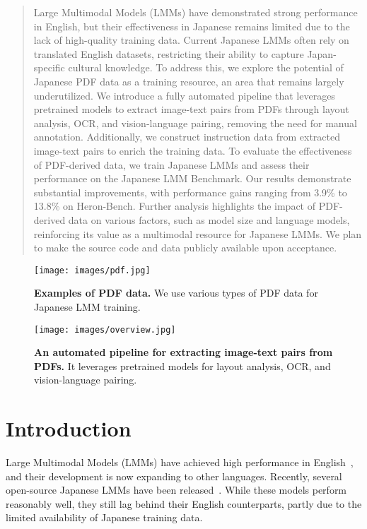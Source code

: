 \begin{abstract}
Large Multimodal Models (LMMs) have demonstrated strong performance in English, but their effectiveness in Japanese remains limited due to the lack of high-quality training data. Current Japanese LMMs often rely on translated English datasets, restricting their ability to capture Japan-specific cultural knowledge. To address this, we explore the potential of Japanese PDF data as a training resource, an area that remains largely underutilized. We introduce a fully automated pipeline that leverages pretrained models to extract image-text pairs from PDFs through layout analysis, OCR, and vision-language pairing, removing the need for manual annotation. Additionally, we construct instruction data from extracted image-text pairs to enrich the training data. To evaluate the effectiveness of PDF-derived data, we train Japanese LMMs and assess their performance on the Japanese LMM Benchmark. Our results demonstrate substantial improvements, with performance gains ranging from 3.9\% to 13.8\% on Heron-Bench. Further analysis highlights the impact of PDF-derived data on various factors, such as model size and language models, reinforcing its value as a multimodal resource for Japanese LMMs. We plan to make the source code and data publicly available upon acceptance.
\end{abstract}

\begin{figure}[t]
  \texttt{[image: images/pdf.jpg]}
  \vspace{-8mm}
  \caption{\textbf{Examples of PDF data.} 
  We use various types of PDF data for Japanese LMM training.
  }
  \label{fig:pdf-category}
\end{figure}

\begin{figure*}[t]
  \texttt{[image: images/overview.jpg]}
  \vspace{-8mm}
  \caption{\textbf{An automated pipeline for extracting image-text pairs from PDFs.} 
  It leverages pretrained models for layout analysis, OCR, and vision-language pairing.}
  \label{fig:overview}
\end{figure*}


\section{Introduction}
Large Multimodal Models (LMMs) have achieved high performance in English~\cite{openai2024gpt4o,geminipro,llama3.1,yang2024qwen2}, and their development is now expanding to other languages. Recently, several open-source Japanese LMMs have been released~\cite{akiba2025evolutionary,BlipJapaneseStableLM,inoue2024heron,cyberagent2024llava,VILAjp}. While these models perform reasonably well, they still lag behind their English counterparts, partly due to the limited availability of Japanese training data.

